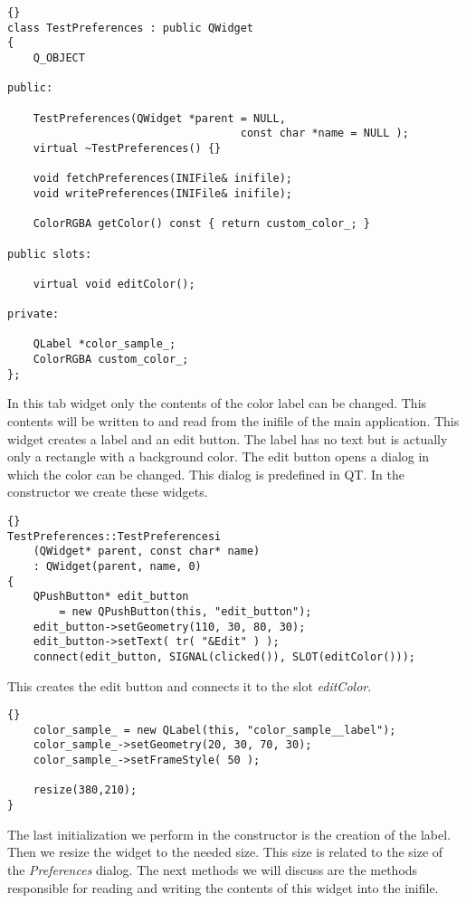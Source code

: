 \begin{lstlisting}{}
class TestPreferences : public QWidget
{
	Q_OBJECT
		
public:

	TestPreferences(QWidget *parent = NULL, 
									const char *name = NULL );
	virtual ~TestPreferences() {}
	
	void fetchPreferences(INIFile& inifile);
	void writePreferences(INIFile& inifile);

	ColorRGBA getColor() const { return custom_color_; }

public slots:

	virtual void editColor();

private:

	QLabel *color_sample_;
	ColorRGBA custom_color_;
};
\end{lstlisting}

In this tab widget only the contents of the color label can be changed.
This contents will be written to and read from the inifile of the main application.
This widget creates a label and an edit button. The label has no text but is
actually only a rectangle with a background color. The edit button opens a dialog
in which the color can be changed. This dialog is predefined in QT.
In the constructor we create these widgets.

\begin{lstlisting}{}
TestPreferences::TestPreferencesi
	(QWidget* parent, const char* name)
	: QWidget(parent, name, 0)
{
	QPushButton* edit_button 
		= new QPushButton(this, "edit_button");
	edit_button->setGeometry(110, 30, 80, 30);
	edit_button->setText( tr( "&Edit" ) );
	connect(edit_button, SIGNAL(clicked()), SLOT(editColor()));
\end{lstlisting}

This creates the edit button and connects it to the slot {\em editColor}.
	
\begin{lstlisting}{}
	color_sample_ = new QLabel(this, "color_sample__label");
	color_sample_->setGeometry(20, 30, 70, 30);
	color_sample_->setFrameStyle( 50 );
	
	resize(380,210);
}
\end{lstlisting}

The last initialization we perform in the constructor is the creation of the
label. Then we resize the widget to the needed size. This size is related to the
size of the {\em Preferences} dialog.
The next methods we will discuss are the methods responsible for reading and
writing the contents of this widget into the inifile.\\

